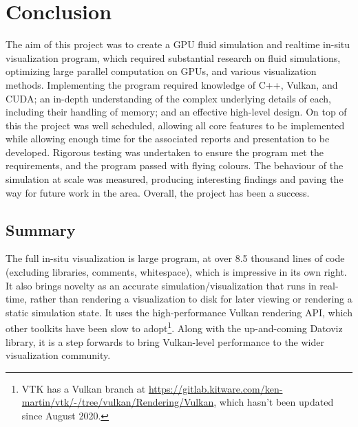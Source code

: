 
\chapter{Conclusion}
\label{sec:Conclusion} 





The aim of this project was to create a GPU fluid simulation and realtime in-situ visualization program, which required substantial research on fluid simulations, optimizing large parallel computation on GPUs, and various visualization methods.
Implementing the program required knowledge of C++, Vulkan, and CUDA; an in-depth understanding of the complex underlying details of each, including their handling of memory; and an effective high-level design.
On top of this the project was well scheduled, allowing all core features to be implemented while allowing enough time for the associated reports and presentation to be developed.
Rigorous testing was undertaken to ensure the program met the requirements, and the program passed with flying colours.
The behaviour of the simulation at scale was measured, producing interesting findings and paving the way for future work in the area.
Overall, the project has been a success.

\section{Summary}
The full in-situ visualization is large program, at over 8.5 thousand lines of code (excluding libraries, comments, whitespace), which is impressive in its own right.
It also brings novelty as an accurate simulation/visualization that runs in real-time, rather than rendering a visualization to disk for later viewing or rendering a static simulation state.
It uses the high-performance Vulkan rendering API, which other toolkits have been slow to adopt\footnote{VTK has a Vulkan branch at \url{https://gitlab.kitware.com/ken-martin/vtk/-/tree/vulkan/Rendering/Vulkan}, which hasn't been updated since August 2020.}.
Along with the up-and-coming Datoviz library\cite{Datoviz}, it is a step forwards to bring Vulkan-level performance to the wider visualization community.

